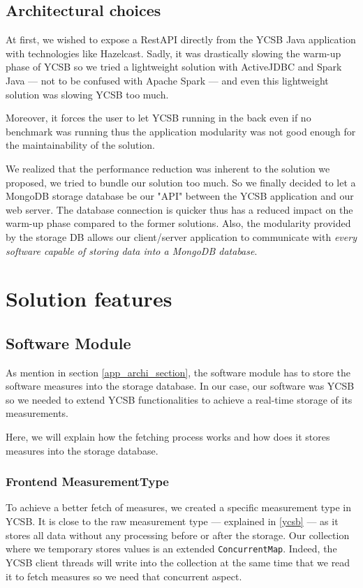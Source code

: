 \documentclass[a4paper,11pt]{report}
\begin{document}
\subsection{Architectural choices}

At first, we wished to expose a RestAPI directly from the YCSB Java application with technologies like Hazelcast. Sadly, it was drastically slowing the warm-up phase of YCSB so we tried a lightweight solution with ActiveJDBC and Spark Java --- not to be confused with Apache Spark --- and even this lightweight solution was slowing YCSB too much. 

Moreover, it forces the user to let YCSB running in the back even if no benchmark was running thus the application modularity was not good enough for the maintainability of the solution. 

We realized that the performance reduction was inherent to the solution we proposed, we tried to bundle our solution too much. So we finally decided to let a MongoDB storage database be our "API" between the YCSB application and our web server. The database connection is quicker thus has a reduced impact on the warm-up phase compared to the former solutions. Also, the modularity provided by the storage DB allows our client/server application to communicate with \textit{every software capable of storing data into a MongoDB database}.

\section{Solution features}\label{technical_description}

\subsection{Software Module}

As mention in section \ref{app_archi_section}, the software module has to store the software measures into the storage database. In our case, our software was YCSB so we needed to extend YCSB functionalities to achieve a real-time storage of its measurements. 

Here, we will explain how the fetching process works and how does it stores measures into the storage database.

\subsubsection{Frontend MeasurementType}\label{concurrent_map_explainations} To achieve a better fetch of measures, we created a specific measurement type in YCSB. It is close to the raw measurement type --- explained in \ref{ycsb} --- as it stores all data without any processing before or after the storage. Our collection where we temporary stores values is an extended \texttt{ConcurrentMap}. Indeed, the YCSB client threads will write into the collection at the same time that we read it to fetch measures so we need that concurrent aspect.
\end{document}
